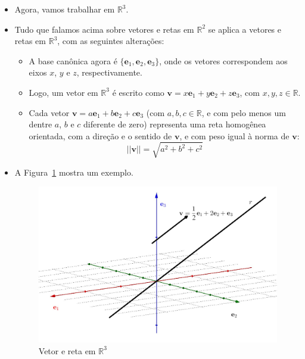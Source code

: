 \documentclass[
  letterpaper,
  DIV=11,
  numbers=noendperiod]{scrreprt}
\begin{document}
\begin{itemize}
\item
  Agora, vamos trabalhar em $\mathbb{R}^3$.
\item
  Tudo que falamos acima sobre vetores e retas em $\mathbb{R}^2$ se
  aplica a vetores e retas em $\mathbb{R}^3$, com as seguintes
  alterações:

  \begin{itemize}
  \item
    A base canônica agora é
    $\{ \mathbf{e}_{1}, \mathbf{e}_{2}, \mathbf{e}_{3} \}$, onde os
    vetores correspondem aos eixos $x$, $y$ e $z$, respectivamente.
  \item
    Logo, um vetor em $\mathbb{R}^3$ é escrito como
    $\mathbf{v} = x\mathbf{e}_{1} + y\mathbf{e}_{2} + z\mathbf{e}_{3}$,
    com $x, y, z \in \mathbb{R}$.
  \item
    Cada vetor
    $\mathbf{v} = a\mathbf{e}_{1} + b\mathbf{e}_{2} + c\mathbf{e}_{3}$
    (com $a, b, c \in \mathbb{R}$, e com pelo menos um dentre $a$, $b$ e
    $c$ diferente de zero) representa uma reta homogênea orientada, com
    a direção e o sentido de $\mathbf{v}$, e com peso igual à norma de
    $\mathbf{v}$: \[
    ||\mathbf{v}|| = \sqrt{a^2 + b^2 + c^2}
    \]
  \end{itemize}
\item
  A Figura~\ref{fig-reta-r3} mostra um exemplo.

  \begin{figure}[t]

  {\centering \includegraphics[width=1\textwidth,height=\textheight]{figures/reta-r3.png}

  }

  \caption{\label{fig-reta-r3}Vetor e reta em $\mathbb{R}^3$}

  \end{figure}
\end{itemize}
\end{document}

